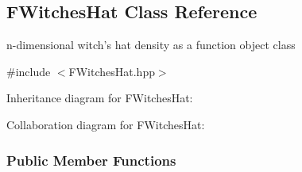 \hypertarget{classFWitchesHat}{\subsection{\-F\-Witches\-Hat \-Class \-Reference}
\label{classFWitchesHat}
}


n-\/dimensional witch's hat density as a function object class  




{\ttfamily \#include $<$\-F\-Witches\-Hat.\-hpp$>$}



\-Inheritance diagram for \-F\-Witches\-Hat\-:


\-Collaboration diagram for \-F\-Witches\-Hat\-:
\subsubsection*{\-Public \-Member \-Functions}
